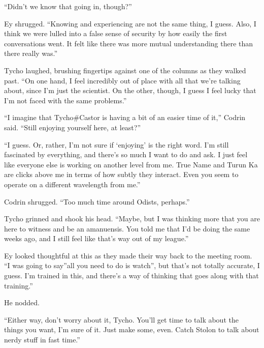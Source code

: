 ``Didn't we know that going in, though?''

Ey shrugged. ``Knowing and experiencing are not the same thing, I guess. Also, I think we were lulled into a false sense of security by how easily the first conversations went. It felt like there was more mutual understanding there than there really was.''

Tycho laughed, brushing fingertips against one of the columns as they walked past. ``On one hand, I feel incredibly out of place with all that we're talking about, since I'm just the scientist. On the other, though, I guess I feel lucky that I'm not faced with the same problems.''

``I imagine that Tycho\#Castor is having a bit of an easier time of it,'' Codrin said. ``Still enjoying yourself here, at least?''

``I guess. Or, rather, I'm not sure if `enjoying' is the right word. I'm still fascinated by everything, and there's so much I want to do and ask. I just feel like everyone else is working on another level from me. True Name and Turun Ka are clicks above me in terms of how subtly they interact. Even you seem to operate on a different wavelength from me.''

Codrin shrugged. ``Too much time around Odists, perhaps.''

Tycho grinned and shook his head. ``Maybe, but I was thinking more that you are here to witness and be an amanuensis. You told me that I'd be doing the same weeks ago, and I still feel like that's way out of my league.''

Ey looked thoughtful at this as they made their way back to the meeting room. ``I was going to say''all you need to do is watch'', but that's not totally accurate, I guess. I'm trained in this, and there's a way of thinking that goes along with that training.''

He nodded.

``Either way, don't worry about it, Tycho. You'll get time to talk about the things you want, I'm sure of it. Just make some, even. Catch Stolon to talk about nerdy stuff in fast time.''
